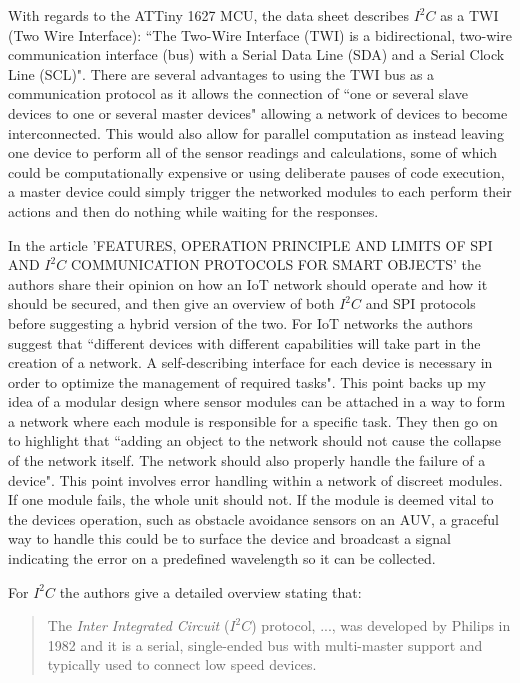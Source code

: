 \documentclass[11pt,a4paper,titlepage]{report}
\begin{document}
	With regards to the ATTiny 1627 MCU, the data sheet describes $I^{2}C$ as a TWI (Two Wire Interface): ``The Two-Wire Interface (TWI) is a bidirectional, two-wire communication interface (bus) with a Serial Data Line (SDA) and a Serial Clock Line (SCL)"\cite{ATTINY1627}. There are several advantages to using the TWI bus as a communication protocol as it allows the connection of ``one or several slave devices to one or several master devices"\cite{ATTINY1627} allowing a network of devices to become interconnected. This would also allow for parallel computation as instead leaving one device to perform all of the sensor readings and calculations, some of which could be computationally expensive or using deliberate pauses of code execution, a master device could simply trigger the networked modules to each perform their actions and then do nothing while waiting for the responses. 
	
	In the article 'FEATURES, OPERATION PRINCIPLE AND LIMITS OF SPI AND $I^{2}C$ COMMUNICATION PROTOCOLS FOR SMART OBJECTS' the authors share their opinion on how an IoT network should operate and how it should be secured, and then give an overview of both $I^{2}C$ and SPI protocols before suggesting a hybrid version of the two. For IoT networks the authors suggest that ``different devices with different capabilities will take part in the creation of a network. A self-describing interface for each device is necessary in order to optimize the management of required tasks"\cite{I2C}. This point backs up my idea of a modular design where sensor modules can be attached in a way to form a network where each module is responsible for a specific task. They then go on to highlight that ``adding an object to the network should not cause the collapse of the network itself. The network should also properly handle the failure of a device"\cite{I2C}. This point involves error handling within a network of discreet modules. If one module fails, the whole unit should not. If the module is deemed vital to the devices operation, such as obstacle avoidance sensors on an AUV, a graceful way to handle this could be to surface the device and broadcast a signal indicating the error on a predefined wavelength so it can be collected. 
	
	For $I^{2}C$ the authors give a detailed overview stating that:
	
	\begin{quote}
		The \textit{Inter Integrated Circuit} ($I^{2}C$) protocol, ..., was developed by Philips in 1982 and it is a serial, single-ended bus with multi-master support and typically used to connect low speed devices.\cite{I2C}
	\end{quote}
	
\end{document}
